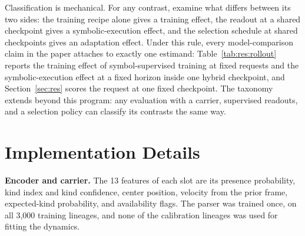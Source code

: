 Classification is mechanical. For any contrast, examine what differs between its two sides: the training recipe alone gives a training effect, the readout at a shared checkpoint gives a symbolic-execution effect, and the selection schedule at shared checkpoints gives an adaptation effect. Under this rule, every model-comparison claim in the paper attaches to exactly one estimand: Table~\ref{tab:res:rollout} reports the training effect of symbol-supervised training at fixed requests and the symbolic-execution effect at a fixed horizon inside one hybrid checkpoint, and Section~\ref{sec:res} scores the request at one fixed checkpoint. The taxonomy extends beyond this program: any evaluation with a carrier, supervised readouts, and a selection policy can classify its contrasts the same way.

\section{Implementation Details}
\label{sec:app:impl}

\textbf{Encoder and carrier.} The 13 features of each slot are its presence probability, kind index and kind confidence, center position, velocity from the prior frame, expected-kind probability, and availability flags. The parser was trained once, on all 3,000 training lineages, and none of the calibration lineages was used for fitting the dynamics.


